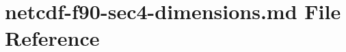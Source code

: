 \hypertarget{netcdf-f90-sec4-dimensions_8md}{}\section{netcdf-\/f90-\/sec4-\/dimensions.md File Reference}
\label{netcdf-f90-sec4-dimensions_8md}

